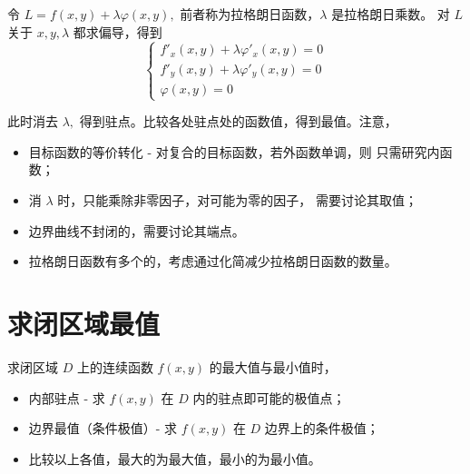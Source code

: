 令 $ L = f(x,y) + \lambda\varphi(x,y), $ 前者称为拉格朗日函数，$ \lambda $ 是拉格朗日乘数。
对 $ L $ 关于 $ x,y,\lambda $ 都求偏导，得到
$$
    \begin{cases}
        f'_x(x,y) + \lambda\varphi'_x(x,y) = 0\\ 
        f'_y(x,y) + \lambda\varphi'_y(x,y) = 0\\ 
        \varphi(x,y) = 0
    \end{cases}
$$ 

此时消去 $ \lambda, $ 得到驻点。比较各处驻点处的函数值，得到最值。注意，

\begin{itemize}
    \item 目标函数的等价转化 - 对复合的目标函数，若外函数单调，则
    只需研究内函数；
    \item 消 $ \lambda $ 时，只能乘除非零因子，对可能为零的因子，
    需要讨论其取值；
    \item 边界曲线不封闭的，需要讨论其端点。
    \item 拉格朗日函数有多个的，考虑通过化简减少拉格朗日函数的数量。
\end{itemize}

\section{求闭区域最值}

求闭区域 $ D $ 上的连续函数 $ f(x,y) $ 的最大值与最小值时，
\begin{itemize}
    \item 内部驻点 - 求 $ f(x,y) $ 在 $ D $ 内的驻点即可能的极值点；
    \item 边界最值（条件极值）- 求 $ f(x,y) $ 在 $ D $ 边界上的条件极值；
    \item 比较以上各值，最大的为最大值，最小的为最小值。
\end{itemize}

